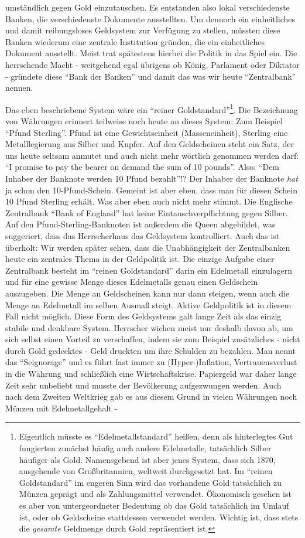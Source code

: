 umständlich gegen Gold einzutauschen. Es entstanden also lokal verschiedenste Banken, die verschiedenste Dokumente ausstellten. Um dennoch ein einheitliches und damit reibungsloses Geldsystem zur Verfügung zu stellen, müssten diese Banken wiederum eine zentrale Institution gründen, die ein einheitliches Dokument ausstellt. Meist trat spätestens hierbei die Politik in das Spiel ein. Die herrschende Macht - weitgehend egal übrigens ob König, Parlament oder Diktator - gründete diese "`Bank der Banken"' und damit das was wir heute "`Zentralbank"' nennen.

Das eben beschriebene System wäre ein "`reiner Goldstandard"'\footnote{Eigentlich müsste es "`Edelmetallstandard"' heißen, denn als hinterlegtes Gut fungierten zunächst häufig auch andere Edelmetalle, tatsächlich Silber häufiger als Gold. Namensgebend ist aber jenes System, dass sich 1870, ausgehende von Großbritannien, weltweit durchgesetzt hat. Im "`reinen Goldstandard"' im engeren Sinn wird das vorhandene Gold tatsächlich zu Münzen geprägt und als Zahlungsmittel verwendet. Ökonomisch gesehen ist es aber von untergeordneter Bedeutung ob das Gold tatsächlich im Umlauf ist, oder ob Geldscheine stattdessen verwendet werden. Wichtig ist, dass stets die \textit{gesamte} Geldmenge durch Gold repräsentiert ist.}. Die Bezeichnung von Währungen erinnert teilweise noch heute an dieses System: Zum Beispiel "`Pfund Sterling"'. Pfund ist eine Gewichtseinheit (Masseneinheit), Sterling eine Metalllegierung aus Silber und Kupfer. Auf den Geldscheinen steht ein Satz, der uns heute seltsam anmutet und auch nicht mehr wörtlich genommen werden darf: "`I promise to pay the bearer on demand the sum of 10 pounds"'. Also: "`Dem Inhaber der Banknote werden 10 Pfund bezahlt"'!? Der Inhaber der Banknote \textit{hat} ja schon den 10-Pfund-Schein. Gemeint ist aber eben, dass man für diesen Schein 10 Pfund Sterling erhält. Was aber eben auch nicht mehr stimmt. Die Englische Zentralbank "`Bank of England"' hat keine Eintauschverpflichtung gegen Silber. Auf den Pfund-Sterling-Banknoten ist außerdem die Queen abgebildet, was suggeriert, dass das Herrscherhaus das Geldsystem kontrolliert. Auch das ist überholt: Wir werden später sehen, dass die Unabhängigkeit der Zentralbanken heute ein zentrales Thema in der Geldpolitik ist. Die einzige Aufgabe einer Zentralbank besteht im "`reinen Goldstandard"' darin ein Edelmetall einzulagern und für eine gewisse Menge dieses Edelmetalls genau einen Geldschein auszugeben. Die Menge an Geldscheinen kann nur dann steigen, wenn auch die Menge an Edelmetall im selben Ausmaß steigt. Aktive Geldpolitik ist in diesem Fall nicht möglich. Diese Form des Geldsystems galt lange Zeit als das einzig stabile und denkbare System. Herrscher wichen meist nur deshalb davon ab, um sich selbst einen Vorteil zu verschaffen, indem sie zum Beispiel zusätzliches - nicht durch Gold gedecktes - Geld druckten um ihre Schulden zu bezahlen. Man nennt das "`Seignorage"' und es führt fast immer zu (Hyper-)Inflation, Vertrauensverlust in die Währung und schließlich eine Wirtschaftskrise. Papiergeld war daher lange Zeit sehr unbeliebt und musste der Bevölkerung aufgezwungen werden. Auch nach dem Zweiten Weltkrieg gab es aus diesem Grund in vielen Währungen noch Münzen mit Edelmetallgehalt - 